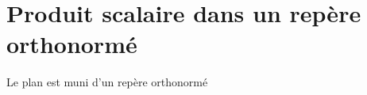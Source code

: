     
    
    
    \section{Produit scalaire dans un repère orthonormé}
    
    Le plan est muni d'un repère orthonormé \Rij
    
